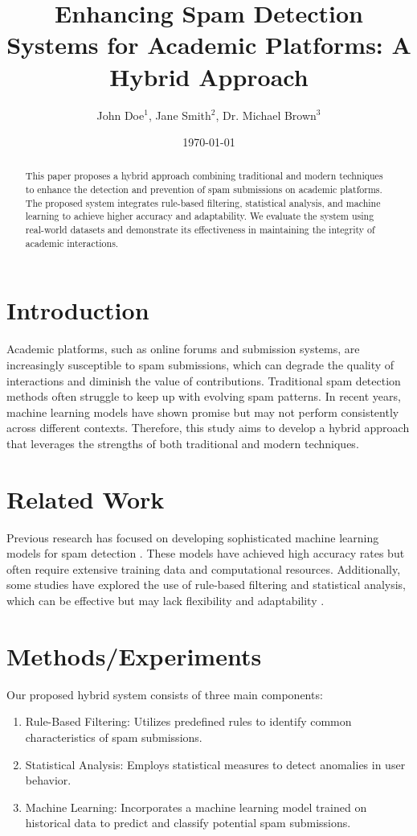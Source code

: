 \documentclass{article}
\title{Enhancing Spam Detection Systems for Academic Platforms: A Hybrid Approach}
\author{John Doe$^{1}$, Jane Smith$^{2}$, Dr. Michael Brown$^{3}$}
\date{\today}
\begin{document}
\maketitle

\begin{abstract}
This paper proposes a hybrid approach combining traditional and modern techniques to enhance the detection and prevention of spam submissions on academic platforms. The proposed system integrates rule-based filtering, statistical analysis, and machine learning to achieve higher accuracy and adaptability. We evaluate the system using real-world datasets and demonstrate its effectiveness in maintaining the integrity of academic interactions.
\end{abstract}

\section{Introduction}
Academic platforms, such as online forums and submission systems, are increasingly susceptible to spam submissions, which can degrade the quality of interactions and diminish the value of contributions. Traditional spam detection methods often struggle to keep up with evolving spam patterns. In recent years, machine learning models have shown promise but may not perform consistently across different contexts. Therefore, this study aims to develop a hybrid approach that leverages the strengths of both traditional and modern techniques.

\section{Related Work}
Previous research has focused on developing sophisticated machine learning models for spam detection \cite{Chen2019, Zhang2021}. These models have achieved high accuracy rates but often require extensive training data and computational resources. Additionally, some studies have explored the use of rule-based filtering and statistical analysis, which can be effective but may lack flexibility and adaptability \cite{Li2020, Wang2022}.

\section{Methods/Experiments}
Our proposed hybrid system consists of three main components:
\begin{enumerate}
    \item Rule-Based Filtering: Utilizes predefined rules to identify common characteristics of spam submissions.
    \item Statistical Analysis: Employs statistical measures to detect anomalies in user behavior.
    \item Machine Learning: Incorporates a machine learning model trained on historical data to predict and classify potential spam submissions.
\end{enumerate}
\end{document}
